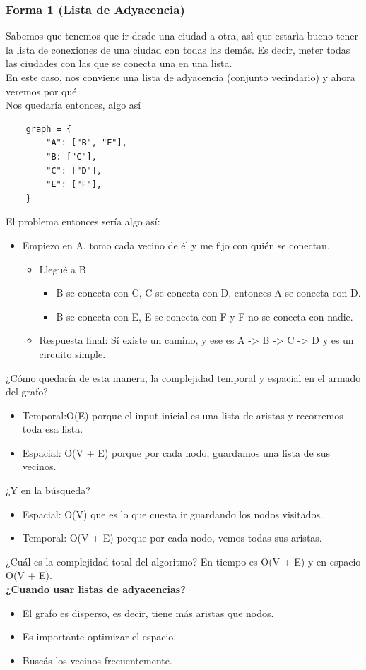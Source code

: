 \documentclass[10pt,a4paper]{article}
\begin{document}
\subsubsection*{Forma 1 (Lista de Adyacencia)}
Sabemos que tenemos que ir desde una ciudad a otra, asì que estarìa bueno tener la lista de conexiones de una ciudad con todas las demás. Es decir, meter todas las ciudades con las que se conecta una en una lista. \\
En este caso, nos conviene una lista de adyacencia (conjunto vecindario) y ahora veremos por qué.\\
Nos quedaría entonces, algo así 
\begin{lstlisting}
    graph = {
        "A": ["B", "E"],
        "B: ["C"],
        "C": ["D"],
        "E": ["F"],
    }
\end{lstlisting}
El problema entonces sería algo así: 
\begin{itemize}
    \item Empiezo en A, tomo cada vecino de él y me fijo con quién se conectan.
    \begin{itemize}
        \item Llegué a B
        \begin{itemize}
            \item B se conecta con C, C se conecta con D, entonces A se conecta con D. 
            \item B se conecta con E, E se conecta con F y F no se conecta con nadie.
        \end{itemize}
        \item Respuesta final: Sí existe un camino, y ese es A -> B -> C -> D y es un circuito simple.
    \end{itemize}
\end{itemize}
¿Cómo quedaría de esta manera, la complejidad temporal y espacial en el armado del grafo? 
\begin{itemize}
    \item Temporal:O(E) porque el input inicial es una lista de aristas y recorremos toda esa lista.
    \item Espacial: O(V + E) porque por cada nodo, guardamos una lista de sus vecinos.
\end{itemize}
¿Y en la búsqueda? 
\begin{itemize}
    \item Espacial: O(V) que es lo que cuesta ir guardando los nodos visitados. 
    \item Temporal: O(V + E) porque por cada nodo, vemos todas sus aristas.
\end{itemize}
¿Cuál es la complejidad total del algoritmo? En tiempo es O(V + E) y en espacio O(V + E). \\
\textbf{¿Cuando usar listas de adyacencias?}
\begin{itemize}
    \item El grafo es disperso, es decir, tiene más aristas que nodos.
    \item Es importante optimizar el espacio.
    \item Buscás los vecinos frecuentemente.
\end{itemize}
\end{document}
